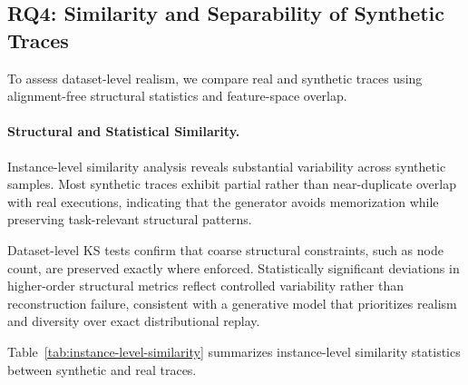 \documentclass[sigconf,review]{acmart}
\begin{document}
\subsection{RQ4: Similarity and Separability of Synthetic Traces}
\label{sec:rq4}


To assess dataset-level realism, we compare real and synthetic traces using alignment-free structural statistics and feature-space overlap.


\paragraph{Structural and Statistical Similarity.}
Instance-level similarity analysis reveals substantial variability across synthetic samples. Most synthetic traces exhibit partial rather than near-duplicate overlap with real executions, indicating that the generator avoids memorization while preserving task-relevant structural patterns.

Dataset-level KS tests confirm that coarse structural constraints, such as node count, are preserved exactly where enforced. Statistically significant deviations in higher-order structural metrics reflect controlled variability rather than reconstruction failure, consistent with a generative model that prioritizes realism and diversity over exact distributional replay.

Table~\ref{tab:instance-level-similarity} summarizes instance-level similarity statistics between synthetic and real traces.
\end{document}
